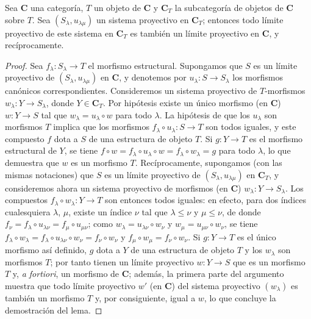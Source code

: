 \begin{lemma}[8.2.4]
\label{IV.8.2.4-fr}
Sea $\boldsymbol{C}$ una categoría, $T$ un objeto de $\boldsymbol{C}$ y $\boldsymbol{C}_T$ la subcategoría de objetos de $\boldsymbol{C}$ sobre $T$.
Sea $(S_\lambda,u_{\lambda\mu})$ un sistema proyectivo en $\boldsymbol{C}_T$; entonces todo límite proyectivo de este sistema en $\boldsymbol{C}_T$ es también un límite proyectivo en $\boldsymbol{C}$, y recíprocamente.
\end{lemma}

\begin{proof}
Sea $f_\lambda:S_\lambda\to T$ el morfismo estructural.
Supongamos que $S$ es un límite proyectivo de $(S_\lambda,u_{\lambda\mu})$ en $\boldsymbol{C}$, y denotemos por $u_\lambda:S\to S_\lambda$ los morfismos canónicos correspondientes.
Consideremos un sistema proyectivo de $T$-morfismos $w_\lambda:Y\to S_\lambda$, donde $Y\in\boldsymbol{C}_T$.
Por hipótesis existe un único morfismo (en $\boldsymbol{C}$) $w:Y\to S$ tal que $w_\lambda=u_\lambda\circ w$ para todo $\lambda$.
La hipótesis de que los $u_\lambda$ son morfismos $T$ implica que los morfismos $f_\lambda\circ u_\lambda:S\to T$ son todos iguales, y este compuesto $f$ dota a $S$ de una estructura de objeto $T$.
Si $g:Y\to T$ es el morfismo estructural de $Y$, se tiene $f\circ w=f_\lambda\circ u_\lambda\circ w=f_\lambda\circ w_\lambda=g$ para todo $\lambda$, lo que demuestra que $w$ es un morfismo $T$.
Recíprocamente, supongamos (con las mismas notaciones) que $S$ es un límite proyectivo de $(S_\lambda,u_{\lambda\mu})$ en $\boldsymbol{C}_T$, y consideremos ahora un sistema proyectivo de morfismos (en $\boldsymbol{C}$) $w_\lambda:Y\to S_\lambda$.
Los compuestos $f_\lambda\circ w_\lambda:Y\to T$ son entonces todos iguales: en efecto, para dos índices cualesquiera $\lambda$, $\mu$, existe un índice $\nu$ tal que $\lambda\leq\nu$ y $\mu\leq\nu$, de donde $f_\nu=f_\lambda\circ u_{\lambda\nu}=f_\mu\circ u_{\mu\nu}$; como $w_\lambda=u_{\lambda\nu}\circ w_\nu$ y $w_\mu=u_{\mu\nu}\circ w_\nu$, se tiene $f_\lambda\circ w_\lambda=f_\lambda\circ u_{\lambda\nu}\circ w_\nu
=f_\nu\circ w_\nu$ y $f_\mu\circ w_\mu=f_\nu\circ w_\nu$.
Si $g:Y\to T$ es el único morfismo así definido, $g$ dota a $Y$ de una estructura de objeto $T$ y los $w_\lambda$ son morfismos $T$; por tanto tienen un límite proyectivo $w:Y\to S$ que es un morfismo $T$ y, \emph{a fortiori}, un morfismo de $\boldsymbol{C}$; además, la primera parte del argumento muestra que todo límite proyectivo $w'$ (en $\boldsymbol{C}$) del sistema proyectivo $(w_\lambda)$ es también un morfismo $T$ y, por consiguiente, igual a $w$, lo que concluye la demostración del lema.
\end{proof}

